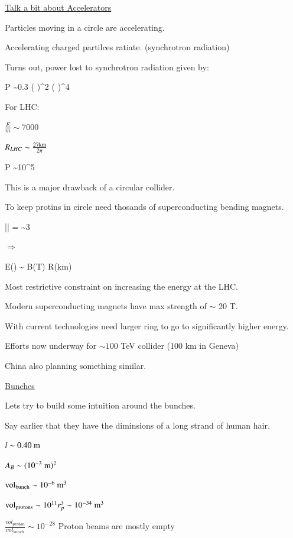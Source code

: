 {\clearpage

\underline{Talk a bit about Accelerators}

Particles moving in a circle are accelerating.

Accelerating charged partilces ratiate. (synchrotron radiation)

Turns out, power lost to synchrotron radiation given by: 

\be
P \sim 0.3 \left( \right)^2  \left( \right)^4   
\ee

For LHC:
\bi
\item[-] $\frac{E}{m} \sim 7000$
\item[-] $R_{LHC} \sim \frac{27 \textrm{km}}{2\pi}$
\ei

\be
P \sim 10^{5} 
\ee

This is a major drawback of a circular collider. 

To keep  protins in circle need thosands of superconducting  bending magnets. 


\be
|| =  \sim 3  
\ee


$\Rightarrow$

\be
E() \sim {} B(T) R(km)
\ee

Most restrictive constraint on increasing the energy at the LHC.

Modern superconducting magnets have max strength of $\sim$ 20 T. 

With current technologies need larger ring to go to significantly higher energy. 

Efforts now underway for $\sim 100$ TeV collider (100 km in Geneva)

China also planning something similar.

\lineacross

\clearpage

\underline{Bunches}

Lets try to build some intuition around the bunches.  

Say earlier that they have the diminsions of a long strand of human hair.

\bi
\item[-] $l \sim 0.40\ \textrm{m}$
\item[-] $A_B \sim (10^{-3}\ \textrm{m})^2$
\item[-] $\rmt{vol}_{\rmt{bunch}} \sim 10^{-6}\ \m^3$
\item[-] $\textrm{vol}_{\textrm{protons}} \sim 10^{11} r_p^3 \sim 10^{-34}\ \textrm{m}^3$
\item[-] $\frac{vol_{proton}}{vol_{bunch}} \sim 10^{-28} $
\ei
Proton beams are mostly empty

}
